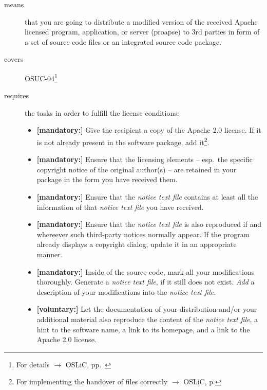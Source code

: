 \begin{description}
\item[means] that you are going to distribute a modified version of the received
Apache licensed program, application, or server (proapse) to 3rd parties in form
of a set of source code files or an integrated source code package.
\item[covers] OSUC-04\footnote{For details $\rightarrow$ OSLiC, pp.\ \pageref{OSUC-04-DEF}}
\item[requires] the tasks in order to fulfill the license conditions:
\begin{itemize}
  
  \item \textbf{[mandatory:]} Give the recipient a copy of the Apache 2.0
  license. If it is not already present in the software package, add
  it\footnote{For implementing the handover of files correctly $\rightarrow$
  OSLiC, p. \pageref{DistributingFilesHint}}.

  \item \textbf{[mandatory:]} Ensure that the licensing elements -- esp.\ the
  specific copyright notice of the original author(s) -- are retained in your
  package in the form you have received them.
  
  \item \textbf{[mandatory:]} Ensure that the \emph{notice text file} contains
  at least all the information of that \emph{notice text file} you have
  received.

  \item \textbf{[mandatory:]} Ensure that the \emph{notice text file} is also
  reproduced if and whereever such third-party notices normally appear. If the
  program already displays a copyright dialog, update it in an appropriate
  manner.
  
  \item \textbf{[mandatory:]} Inside of the source code, mark all your
  modifications thoroughly. Generate a \emph{notice text file}, if it still does
  not exist. \emph{Add} a description of your modifications into the
  \emph{notice text file}.
   
  \item \textbf{[voluntary:]} Let the documentation of your distribution and/or
  your additional material also reproduce the content of the \emph{notice text
  file}, a hint to the software name, a link to its homepage, and a link to the
  Apache 2.0 license.
  
 \end{itemize}
 

\end{description}
